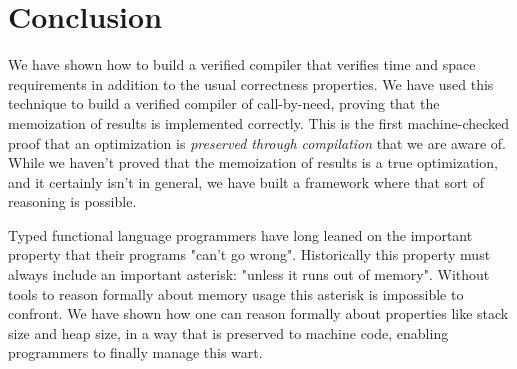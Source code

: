 \section{Conclusion}

We have shown how to build a verified compiler that verifies time and space
requirements in addition to the usual correctness properties. We have used this
technique to build a verified compiler of call-by-need, proving that the
memoization of results is implemented correctly. This is the first
machine-checked proof that an optimization is \emph{preserved through
compilation} that we are aware of. While we haven't proved that the memoization
of results is a true optimization, and it certainly isn't in general, we have
built a framework where that sort of reasoning is possible.

Typed functional language programmers have long leaned on the important property
that their programs "can't go wrong". Historically this property must always
include an important asterisk: "unless it runs out of memory". Without tools to
reason formally about memory usage this asterisk is impossible to confront. We
have shown how one can reason formally about properties like stack size and heap
size, in a way that is preserved to machine code, enabling programmers to
finally manage this wart.

